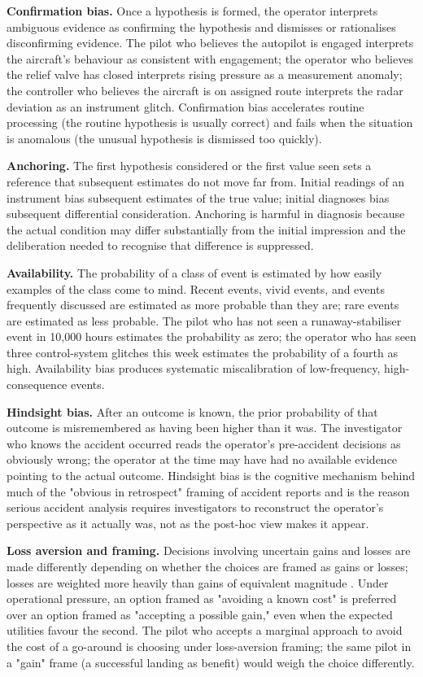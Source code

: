 \textbf{Confirmation bias.} Once a hypothesis is formed, the operator interprets ambiguous evidence as confirming the hypothesis and dismisses or rationalises disconfirming evidence. The pilot who believes the autopilot is engaged interprets the aircraft's behaviour as consistent with engagement; the operator who believes the relief valve has closed interprets rising pressure as a measurement anomaly; the controller who believes the aircraft is on assigned route interprets the radar deviation as an instrument glitch. Confirmation bias accelerates routine processing (the routine hypothesis is usually correct) and fails when the situation is anomalous (the unusual hypothesis is dismissed too quickly).

\textbf{Anchoring.} The first hypothesis considered or the first value seen sets a reference that subsequent estimates do not move far from. Initial readings of an instrument bias subsequent estimates of the true value; initial diagnoses bias subsequent differential consideration. Anchoring is harmful in diagnosis because the actual condition may differ substantially from the initial impression and the deliberation needed to recognise that difference is suppressed.

\textbf{Availability.} The probability of a class of event is estimated by how easily examples of the class come to mind. Recent events, vivid events, and events frequently discussed are estimated as more probable than they are; rare events are estimated as less probable. The pilot who has not seen a runaway-stabiliser event in 10,000 hours estimates the probability as zero; the operator who has seen three control-system glitches this week estimates the probability of a fourth as high. Availability bias produces systematic miscalibration of low-frequency, high-consequence events.

\textbf{Hindsight bias.} After an outcome is known, the prior probability of that outcome is misremembered as having been higher than it was. The investigator who knows the accident occurred reads the operator's pre-accident decisions as obviously wrong; the operator at the time may have had no available evidence pointing to the actual outcome. Hindsight bias is the cognitive mechanism behind much of the "obvious in retrospect" framing of accident reports and is the reason serious accident analysis requires investigators to reconstruct the operator's perspective as it actually was, not as the post-hoc view makes it appear.

\textbf{Loss aversion and framing.} Decisions involving uncertain gains and losses are made differently depending on whether the choices are framed as gains or losses; losses are weighted more heavily than gains of equivalent magnitude \cite{paper:kahneman-tversky-1979}. Under operational pressure, an option framed as "avoiding a known cost" is preferred over an option framed as "accepting a possible gain," even when the expected utilities favour the second. The pilot who accepts a marginal approach to avoid the cost of a go-around is choosing under loss-aversion framing; the same pilot in a "gain" frame (a successful landing as benefit) would weigh the choice differently.

